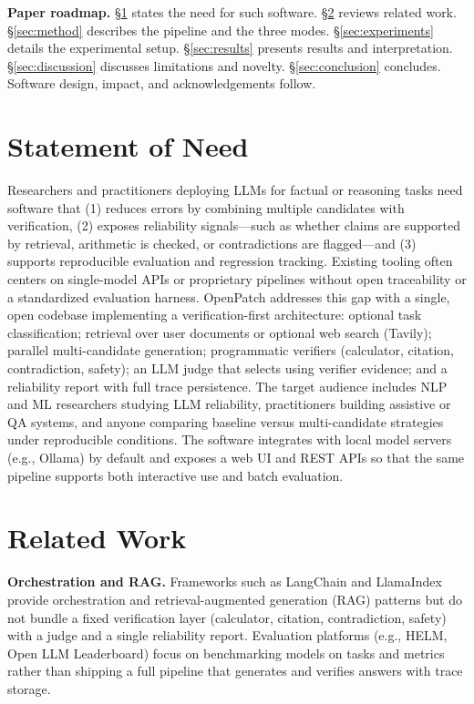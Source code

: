 \documentclass[10pt]{article}
\begin{document}
\textbf{Paper roadmap.} \S\ref{sec:need} states the need for such software. \S\ref{sec:related} reviews related work. \S\ref{sec:method} describes the pipeline and the three modes. \S\ref{sec:experiments} details the experimental setup. \S\ref{sec:results} presents results and interpretation. \S\ref{sec:discussion} discusses limitations and novelty. \S\ref{sec:conclusion} concludes. Software design, impact, and acknowledgements follow.

\section{Statement of Need}
\label{sec:need}
Researchers and practitioners deploying LLMs for factual or reasoning tasks need software that (1) reduces errors by combining multiple candidates with verification, (2) exposes reliability signals---such as whether claims are supported by retrieval, arithmetic is checked, or contradictions are flagged---and (3) supports reproducible evaluation and regression tracking. Existing tooling often centers on single-model APIs or proprietary pipelines without open traceability or a standardized evaluation harness. OpenPatch addresses this gap with a single, open codebase implementing a verification-first architecture: optional task classification; retrieval over user documents or optional web search (Tavily); parallel multi-candidate generation; programmatic verifiers (calculator, citation, contradiction, safety); an LLM judge that selects using verifier evidence; and a reliability report with full trace persistence. The target audience includes NLP and ML researchers studying LLM reliability, practitioners building assistive or QA systems, and anyone comparing baseline versus multi-candidate strategies under reproducible conditions. The software integrates with local model servers (e.g., Ollama) by default and exposes a web UI and REST APIs so that the same pipeline supports both interactive use and batch evaluation.

\section{Related Work}
\label{sec:related}
\textbf{Orchestration and RAG.} Frameworks such as LangChain and LlamaIndex provide orchestration and retrieval-augmented generation (RAG) patterns \citep{lewis2020rag} but do not bundle a fixed verification layer (calculator, citation, contradiction, safety) with a judge and a single reliability report. Evaluation platforms (e.g., HELM, Open LLM Leaderboard) focus on benchmarking models on tasks and metrics rather than shipping a full pipeline that generates and verifies answers with trace storage.
\end{document}
